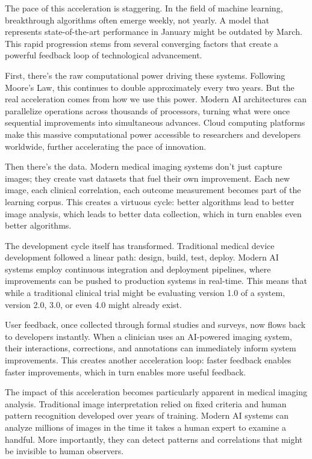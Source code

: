 \documentclass[
  Letterpaper,
]{scrbook}
\begin{document}
The pace of this acceleration is staggering. In the field of machine
learning, breakthrough algorithms often emerge weekly, not yearly. A
model that represents state-of-the-art performance in January might be
outdated by March. This rapid progression stems from several converging
factors that create a powerful feedback loop of technological
advancement.

First, there's the raw computational power driving these systems.
Following Moore's Law, this continues to double approximately every two
years. But the real acceleration comes from how we use this power.
Modern AI architectures can parallelize operations across thousands of
processors, turning what were once sequential improvements into
simultaneous advances. Cloud computing platforms make this massive
computational power accessible to researchers and developers worldwide,
further accelerating the pace of innovation.

Then there's the data. Modern medical imaging systems don't just capture
images; they create vast datasets that fuel their own improvement. Each
new image, each clinical correlation, each outcome measurement becomes
part of the learning corpus. This creates a virtuous cycle: better
algorithms lead to better image analysis, which leads to better data
collection, which in turn enables even better algorithms.

The development cycle itself has transformed. Traditional medical device
development followed a linear path: design, build, test, deploy. Modern
AI systems employ continuous integration and deployment pipelines, where
improvements can be pushed to production systems in real-time. This
means that while a traditional clinical trial might be evaluating
version 1.0 of a system, version 2.0, 3.0, or even 4.0 might already
exist.

User feedback, once collected through formal studies and surveys, now
flows back to developers instantly. When a clinician uses an AI-powered
imaging system, their interactions, corrections, and annotations can
immediately inform system improvements. This creates another
acceleration loop: faster feedback enables faster improvements, which in
turn enables more useful feedback.

The impact of this acceleration becomes particularly apparent in medical
imaging analysis. Traditional image interpretation relied on fixed
criteria and human pattern recognition developed over years of training.
Modern AI systems can analyze millions of images in the time it takes a
human expert to examine a handful. More importantly, they can detect
patterns and correlations that might be invisible to human observers.
\end{document}
